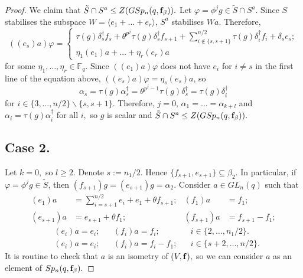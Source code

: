 \begin{proof}
We claim that $\tilde{S} \cap S^a \le Z(GSp_n(q,{\bf f}_{\beta})).$ Let $\varphi =\phi^j g \in \tilde{S} \cap S^a$.  Since $S$ stabilises the subspace $W=\langle e_1 + \ldots +e_r \rangle$,  $S^a$ stabilises $W a.$  Therefore, 
\begin{equation*}
((e_s)a)\varphi=
\begin{cases}
\tau(g) \delta_s^{\dagger} f_s + \theta^{p^j}\tau(g) \delta_s^{\dagger} f_{s+1} + \sum_{i \notin \{s,s+1\}}^{n/2} \tau(g) \delta_i^{\dagger} f_i +\delta_s e_s;\\
\eta_1 (e_1)a+ \ldots +\eta_r(e_r)a
\end{cases}
\end{equation*}
for some $\eta_1, \ldots, \eta_r \in \mathbb{F}_q.$
Since $((e_1)a)\varphi$ does not have $e_i$ for $i \ne s$ in the first line of the equation above, $((e_s )a)\varphi = \eta_s (e_s )a$, so
$$\alpha_s=\tau(g)\alpha_s^{\dagger}=\theta^{p^j-1}\tau(g) \delta_s^{\dagger}=\tau(g)\delta_{i}^{\dagger}$$
for $i \in \{3, \ldots, n/2 \} \backslash \{s, s+1\}.$
Therefore, $j=0$,  $\alpha_1= \ldots = \alpha_{k+l}$ and $\alpha_i=\tau(g)\alpha_i^{\dagger}$ for all $i,$ so $g$ is scalar  and $\tilde{S} \cap S^a \le Z(GSp_n(q,{\bf f}_{\beta})).$




\subsection*{Case 2.} Let $k=0,$ so $l \ge 2.$ Denote $s:=n_1/2.$ Hence $\{f_{s+1},e_{s+1}\} \subseteq \beta_{2}.$ In particular, if $\varphi = \phi^j g \in \tilde{S}$, then $(f_{s+1})g=(e_{s+1})g=\alpha_2.$
Consider $a \in GL_n(q)$ such that
\begin{align*}
(e_1)a & =\sum_{i=s+1}^{n/2} e_i +e_1 + \theta f_{s +1} ;&  (f_1)a & =f_1; \\
(e_{s+1})a & =  e_{s+1}+\theta f_1; & (f_{s +1})a & =f_{s +1} -  f_1; 
\end{align*}
\begin{align*}
&(e_{i})a =e_{i};  & &(f_{i})a=f_{i}; && i\in \{2, \ldots, n_1/2 \}.   \\
&(e_{i})a =e_{i};  & &(f_{i})a=f_{i} -  f_{1}; && i\in \{s+2, \ldots, n/2 \}.   
\end{align*}
 It is routine to check that $a$ is an isometry of $(V, {\bf f}),$ so we can consider $a$ as an element of $Sp_n(q, {\bf f}_{\beta}).$


\end{proof}
